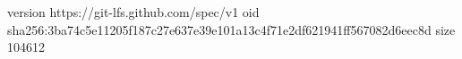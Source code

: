version https://git-lfs.github.com/spec/v1
oid sha256:3ba74c5e11205f187c27e637e39e101a13c4f71e2df621941ff567082d6eec8d
size 104612
